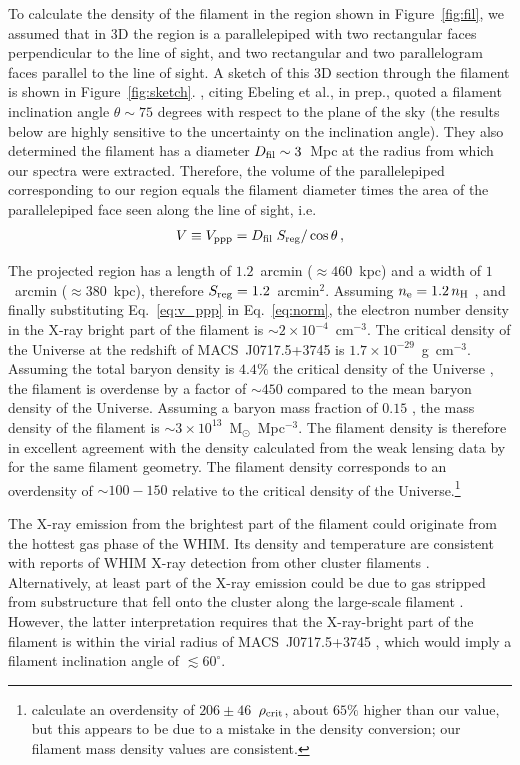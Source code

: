 To calculate the density of the filament in the region shown in Figure~\ref{fig:fil}, we assumed that in 3D the region is a parallelepiped with two rectangular faces perpendicular to the line of sight, and two rectangular and two parallelogram faces parallel to the line of sight. A sketch of this 3D section through the filament is shown in Figure~\ref{fig:sketch}. \citet{Jauzac2012}, citing Ebeling et al., in prep., quoted a filament inclination angle $\theta \sim 75$ degrees with respect to the plane of the sky (the results below are highly sensitive to the uncertainty on the inclination angle). They also determined the filament has a diameter $D_{\rm fil} \sim 3$~Mpc at the radius from which our spectra were extracted. Therefore, the volume of the parallelepiped corresponding to our region equals the filament diameter times the area of the parallelepiped face seen along the line of sight, i.e.
\begin{eqnarray}
    V \equiv V_{\rm ppp} = D_{\rm fil} \; S_{\rm reg} / \cos\theta\,  , 
\label{eq:v_ppp}
\end{eqnarray}

The projected region has a length of $1.2$~arcmin ($\approx 460$~kpc) and a width of $1$~arcmin ($\approx 380$~kpc), therefore $S_{\rm reg} = 1.2$~arcmin$^{2}$. Assuming $n_{\rm e} = 1.2\, n_{\rm H}$ \citep[e.g.,][]{Bohringer2010}, and finally substituting Eq.~\ref{eq:v_ppp} in Eq.~\ref{eq:norm}, the electron number density in the X-ray bright part of the filament is $\sim 2\times 10^{-4}$~cm$^{-3}$. The critical density of the Universe at the redshift of MACS~J0717.5+3745 is $1.7\times 10^{-29}$~g~cm$^{-3}$. Assuming the total baryon density is $4.4\%$ the critical density of the Universe \citep{Kirkman2003}, the filament is overdense by a factor of $\sim 450$ compared to the mean baryon density of the Universe. Assuming a baryon mass fraction of $0.15$ \citep[e.g.,][]{Mantz2014}, the mass density of the filament is $\sim 3\times 10^{13}$~M$_{\odot}$~Mpc$^{-3}$. The filament density is therefore in excellent agreement with the density calculated from the weak lensing data by \citet{Jauzac2012} for the same filament geometry. The filament density corresponds to an overdensity of $\sim 100-150$ relative to the critical density of the Universe.\footnote{\citet{Jauzac2012} calculate an overdensity of $206\pm 46$~$\rho_{\rm crit}$, about $65\%$ higher than our value, but this appears to be due to a mistake in the density conversion; our filament mass density values are consistent.} 

The X-ray emission from the brightest part of the filament could originate from the hottest gas phase of the WHIM. Its density and temperature are consistent with reports of WHIM X-ray detection from other cluster filaments \citep[e.g.,][]{Werner2008, Eckert2015}. Alternatively, at least part of the X-ray emission could be due to gas stripped from substructure that fell onto the cluster along the large-scale filament \citep[similarly to what is seen in A85;][]{Ichinohe2015}. However, the latter interpretation requires that the X-ray-bright part of the filament is within the virial radius of MACS~J0717.5+3745 \citep[$r_{\rm 138} = 2.5$~Mpc;][]{Medezinski2013}, which would imply a filament inclination angle of $\lesssim 60^\circ$. 

